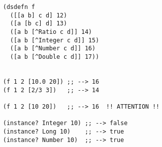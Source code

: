 \begin{lstlisting}[style=reclojureClojure,frame=single]
(dsdefn f 
  ([[a b] c d] 12)
  ([a [b c] d] 13)
  ([a b [^Ratio c d]] 14)
  ([a b [^Integer c d]] 15)
  ([a b [^Number c d]] 16)
  ([a b [^Double c d]] 17))


(f 1 2 [10.0 20]) ;; --> 16 
(f 1 2 [2/3 3])   ;; --> 14

(f 1 2 [10 20])   ;; --> 16  !! ATTENTION !!

(instance? Integer 10) ;; --> false
(instance? Long 10)    ;; --> true
(instance? Number 10)  ;; --> true
\end{lstlisting}
